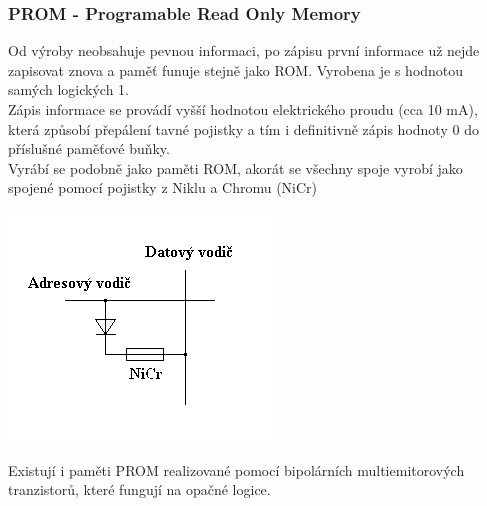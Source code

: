 \subsubsection{PROM - Programable Read Only Memory}
\begin{multicols}{2}
    Od výroby neobsahuje pevnou informaci, po zápisu první informace už nejde zapisovat znova a paměť funuje stejně jako ROM.
    Vyrobena je s hodnotou samých logických 1.\\
    Zápis informace se provádí vyšší hodnotou elektrického proudu (cca 10 mA), která způsobí přepálení tavné pojistky a tím i definitivně zápis hodnoty 0 do příslušné paměťové buňky.\\
    Vyrábí se podobně jako paměti ROM, akorát se všechny spoje vyrobí jako spojené pomocí pojistky z Niklu a Chromu (NiCr)\\
    \columnbreak

    \includegraphics[width=0.7\linewidth]{TVY-POS/Polovodičové paměti/PROM.png}
\end{multicols}
Existují i paměti PROM realizované pomocí bipolárních multiemitorových tranzistorů, které fungují na opačné logice.
